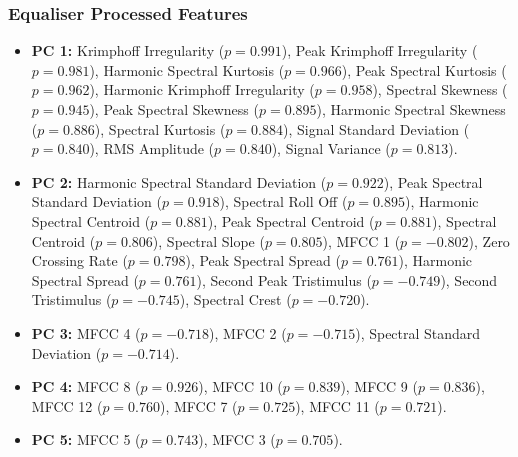 		\subsubsection*{Equaliser Processed Features}
			\begin{itemize}
				\item {\bf{PC 1:}} Krimphoff Irregularity ($p = 0.991$), Peak Krimphoff Irregularity ($p =
					0.981$), Harmonic Spectral Kurtosis ($p = 0.966$), Peak Spectral Kurtosis ($p =
					0.962$), Harmonic Krimphoff Irregularity ($p = 0.958$), Spectral Skewness ($p =
					0.945$), Peak Spectral Skewness ($p = 0.895$), Harmonic Spectral Skewness ($p =
					0.886$), Spectral Kurtosis ($p = 0.884$), Signal Standard Deviation ($p = 0.840$),
					RMS Amplitude ($p = 0.840$), Signal Variance ($p = 0.813$).
				\item {\bf{PC 2:}} Harmonic Spectral Standard Deviation ($p =  0.922$), Peak Spectral
					Standard Deviation ($p =  0.918$), Spectral Roll Off ($p =  0.895$), Harmonic
					Spectral Centroid ($p =  0.881$), Peak Spectral Centroid ($p =  0.881$), Spectral
					Centroid ($p =  0.806$), Spectral Slope ($p =  0.805$), MFCC 1 ($p = -0.802$), Zero
					Crossing Rate ($p =  0.798$), Peak Spectral Spread ($p =  0.761$), Harmonic
					Spectral Spread ($p =  0.761$), Second Peak Tristimulus ($p = -0.749$), Second
					Tristimulus ($p = -0.745$), Spectral Crest ($p = -0.720$).
				\item {\bf{PC 3:}} MFCC 4 ($p = -0.718$), MFCC 2 ($p = -0.715$), Spectral Standard
					Deviation ($p = -0.714$).
				\item {\bf{PC 4:}} MFCC 8 ($p = 0.926$), MFCC 10 ($p = 0.839$), MFCC 9 ($p = 0.836$), MFCC
					12 ($p = 0.760$), MFCC 7 ($p = 0.725$), MFCC 11 ($p = 0.721$).
				\item {\bf{PC 5:}} MFCC 5 ($p = 0.743$), MFCC 3 ($p = 0.705$).
			\end{itemize}

